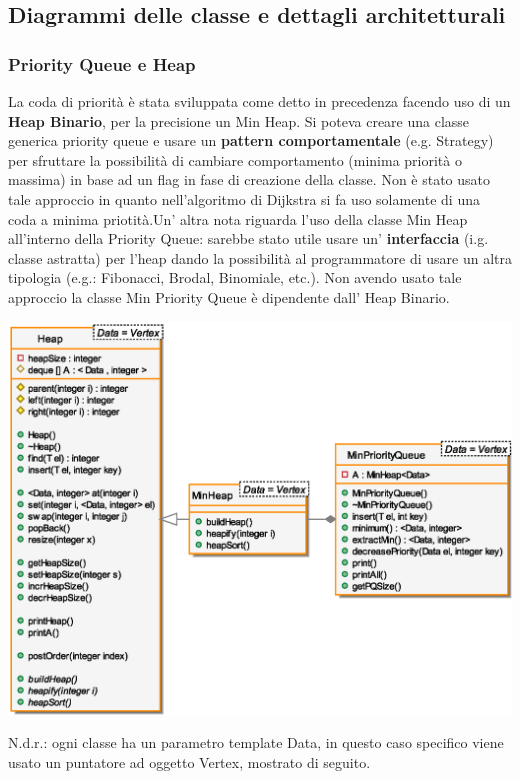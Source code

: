 \subsection{Diagrammi delle classe e dettagli architetturali}
\subsubsection{Priority Queue e Heap}
\indent La coda di priorit\`a \`e stata sviluppata come detto in precedenza facendo uso
di un \textbf{Heap Binario}, per la precisione un Min Heap. Si poteva creare una classe generica 
priority queue e usare un \textbf{pattern comportamentale} (e.g. Strategy) per sfruttare la possibilit\`a
di cambiare comportamento (minima priorit\`a o massima) in base ad un flag in fase di creazione della classe.
Non \`e stato usato tale approccio in quanto nell'algoritmo di Dijkstra si fa uso solamente di una
coda a minima priotit\`a.\newline\indent Un' altra nota riguarda l'uso della classe Min Heap all'interno della
Priority Queue: sarebbe stato utile usare un' \textbf{interfaccia} (i.g. classe astratta) per l'heap dando
la possibilit\`a al programmatore di usare un altra tipologia (e.g.: Fibonacci, Brodal, Binomiale, etc.).
Non avendo usato tale approccio la classe Min Priority Queue \`e dipendente dall' Heap Binario.
\begin{center}
\includegraphics[scale=0.7]{tesina_tex/spacegraph/2img/pq.eps}
\end{center}
N.d.r.: ogni classe ha un parametro template Data, in questo caso specifico viene usato un puntatore ad
oggetto Vertex, mostrato di seguito.

